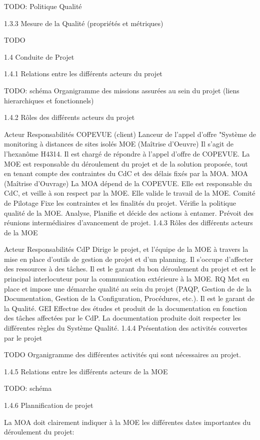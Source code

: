TODO: Politique Qualité

1.3.3   Mesure de la Qualité (propriétés et métriques)

TODO

1.4   Conduite de Projet

1.4.1   Relations entre les différents acteurs du projet

TODO: schéma Organigramme des missions assurées au sein du projet (liens hierarchiques et fonctionnels)

1.4.2   Rôles des différents acteurs du projet

Acteur	Responsabilités
COPEVUE (client)	Lanceur de l'appel d'offre "Système de monitoring à distances de sites isolés
MOE (Maîtrise d'Oeuvre)	Il s'agit de l'hexanôme H4314. Il est chargé de répondre à l'appel d'offre de COPEVUE. La MOE est responsable du déroulement du projet et de la solution proposée, tout en tenant compte des contraintes du CdC et des délais fixés par la MOA.
MOA (Maîtrise d'Ouvrage)	La MOA dépend de la COPEVUE. Elle est responsable du CdC, et veille à son respect par la MOE. Elle valide le travail de la MOE.
Comité de Pilotage	Fixe les contraintes et les finalités du projet. Vérifie la politique qualité de la MOE. Analyse, Planifie et décide des actions à entamer. Prévoit des réunions intermédiaires d'avancement de projet.
1.4.3   Rôles des différents acteurs de la MOE

Acteur	Responsabilités
CdP	Dirige le projet, et l'équipe de la MOE à travers la mise en place d'outils de gestion de projet et d'un planning. Il s'occupe d'affecter des ressources à des tâches. Il est le garant du bon déroulement du projet et est le principal interlocuteur pour la communication extérieure à la MOE.
RQ	Met en place et impose une démarche qualité au sein du projet (PAQP, Gestion de de la Documentation, Gestion de la Configuration, Procédures, etc.). Il est le garant de la Qualité.
GEI	Effectue des études et produit de la documentation en fonction des tâches affectées par le CdP. La documentation produite doit respecter les différentes règles du Système Qualité.
1.4.4   Présentation des activités couvertes par le projet

TODO Organigramme des différentes activités qui sont nécessaires au projet.

1.4.5   Relations entre les différents acteurs de la MOE

TODO: schéma

1.4.6   Plannification de projet

La MOA doit clairement indiquer à la MOE les différentes dates importantes du déroulement du projet:

